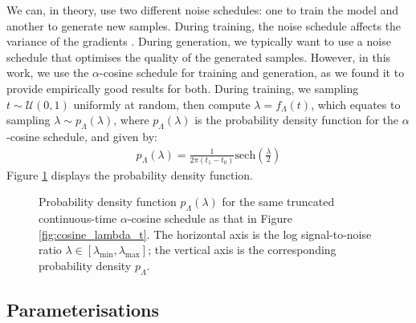 \documentclass[ oneside,%
                    author={George Herbert},
                    degree={MSci},
                     title={Diffusion Models for Time-Evolving Precipitation Fields},
                  subtitle={}]{dissertation}
\begin{document}
We can, in theory, use two different noise schedules: one to train the model and another to generate new samples. During training, the noise schedule affects the variance of the gradients \cite{Understanding_Diffusion_Objective_Kingma}. During generation, we typically want to use a noise schedule that optimises the quality of the generated samples. However, in this work, we use the $\alpha$-cosine schedule for training and generation, as we found it to provide empirically good results for both. During training, we sampling $t\sim\mathcal{U}(0,1)$ uniformly at random, then compute $\lambda=f_\Lambda(t)$, which equates to sampling $\lambda\sim p_\Lambda(\lambda)$, where $p_\Lambda(\lambda)$ is the probability density function for the $\alpha$-cosine schedule, and given by:
\begin{align}
      p_\Lambda(\lambda)=\frac{1}{2\pi(t_1-t_0)}\mathrm{sech}\left(\frac{\lambda}{2}\right)
\end{align}
Figure \ref{fig:p_lambda} displays the probability density function.
\begin{figure}[htbp]
      \centering
      \caption{Probability density function $p_\Lambda(\lambda)$ for the same truncated continuous-time $\alpha$-cosine schedule as that in Figure \ref{fig:cosine_lambda_t}. The horizontal axis is the log signal-to-noise ratio $\lambda\in[\lambda_{\min}, \lambda_{\max}]$; the vertical axis is the corresponding probability density $p_\Lambda$.}
      \label{fig:p_lambda}
\end{figure}

\subsection{Parameterisations}
\label{sec:background_diffusion_parameterisations}
\end{document}
